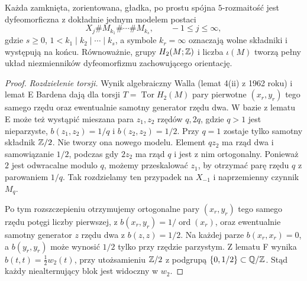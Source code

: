 \begin{twierdzenie}
\label{thm:barden-kanoniczna-24}
Każda zamknięta, zorientowana,
gładka, po prostu spójna
$5$-rozmaitość jest dyfeomorficzna
z dokładnie jednym modelem postaci
\[
 X_j\# M_{k_1}\#\cdots\#M_{k_s},
 \qquad -1\leq j\leq\infty,
\]
gdzie $s\geq0$,
$1<k_1\mid k_2\mid\cdots\mid k_s$,
a symbole $k_r=\infty$ oznaczają
wolne składniki i występują na końcu.
Równoważnie, grupy $H_2(M;\mathbb{Z})$
i liczba $\iota(M)$ tworzą pełny
układ niezmienników dyfeomorfizmu
zachowującego orientację.
\end{twierdzenie}
\begin{proof}
\emph{Rozdzielenie torsji.}
Wynik algebraiczny Walla
(lemat 4(ii) z 1962 roku) i lemat E
Bardena dają dla torsji $T=\operatorname{Tor}H_2(M)$
pary pierwotne $(x_r,y_r)$ tego samego
rzędu oraz ewentualnie samotny
generator rzędu dwa. W bazie
z lematu E może też wystąpić
mieszana para $z_1,z_2$
rzędów $q,2q$, gdzie $q>1$ jest
nieparzyste, $b(z_1,z_2)=1/q$
i $b(z_2,z_2)=1/2$.
Przy $q=1$ zostaje tylko samotny
składnik $\mathbb{Z}/2$.
Nie tworzy ona nowego modelu.
Element $qz_2$ ma rząd dwa i
samowiązanie $1/2$, podczas gdy
$2z_2$ ma rząd $q$ i jest
z nim ortogonalny. Ponieważ
$2$ jest odwracalne modulo $q$,
możemy przeskalować $z_1$, by
otrzymać parę rzędu $q$
z parowaniem $1/q$.
Tak rozdzielamy ten przypadek na
$X_{-1}$ i naprzemienny czynnik
$M_q$.

Po tym rozszczepieniu otrzymujemy
ortogonalne pary $(x_r,y_r)$
tego samego rzędu potęgi liczby
pierwszej, z
$b(x_r,y_r)=1/\operatorname{ord}(x_r)$,
oraz ewentualnie samotny generator
$z$ rzędu dwa z $b(z,z)=1/2$.
Na każdej parze $b(x_r,x_r)=0$,
a $b(y_r,y_r)$ może wynosić $1/2$
tylko przy rzędzie parzystym.
Z lematu F wynika
$b(t,t)=\tfrac12w_2(t)$, przy
utożsamieniu $\mathbb{Z}/2$ z podgrupą
$\{0,1/2\}\subset\mathbb{Q}/\mathbb{Z}$.
Stąd każdy niealternujący blok
jest widoczny w $w_2$.


\end{proof}
